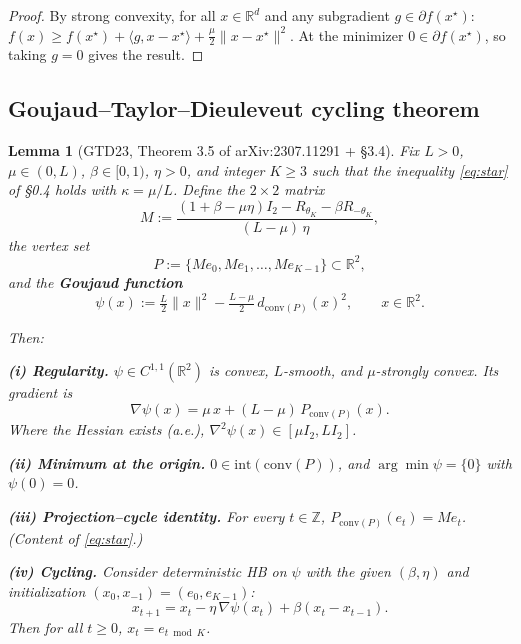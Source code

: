 \documentclass[11pt,a4paper]{article}
\theoremstyle{plain}
\newtheorem{lemma}[theorem]{Lemma}
\theoremstyle{definition}
\theoremstyle{remark}
\newcommand{\R}{\mathbb{R}}
\newcommand{\conv}{\mathrm{conv}}
\begin{document}
\begin{proof}
By strong convexity, for all $x \in \R^d$ and any subgradient $g \in \partial f(x^\star)$: $f(x) \geq f(x^\star) + \langle g, x - x^\star\rangle + \tfrac{\mu}{2}\|x - x^\star\|^2$. At the minimizer $0 \in \partial f(x^\star)$, so taking $g = 0$ gives the result.
\end{proof}

\subsection{Goujaud--Taylor--Dieuleveut cycling theorem}

\begin{lemma}[GTD23, Theorem 3.5 of arXiv:2307.11291 + \S3.4]
\label{lem:1.3}
Fix $L > 0$, $\mu \in (0, L)$, $\beta \in [0, 1)$, $\eta > 0$, and integer $K \geq 3$ such that the inequality \eqref{eq:star} of \S0.4 holds with $\kappa = \mu/L$. Define the $2 \times 2$ matrix
\begin{equation}
M := \frac{(1 + \beta - \mu \eta) I_2 - R_{\theta_K} - \beta R_{-\theta_K}}{(L - \mu)\, \eta},\tag{M-def}\label{eq:M-def}
\end{equation}
the vertex set
\[
P := \{M e_0, M e_1, \ldots, M e_{K-1}\} \subset \R^2,
\]
and the \textbf{Goujaud function}
\begin{equation}
\psi(x) := \tfrac{L}{2}\|x\|^2 - \tfrac{L - \mu}{2}\, d_{\conv(P)}(x)^2,\qquad x \in \R^2.\tag{PSI}\label{eq:PSI}
\end{equation}

Then:

\textbf{(i) Regularity.} $\psi \in C^{1,1}(\R^2)$ is convex, $L$-smooth, and $\mu$-strongly convex. Its gradient is
\begin{equation}
\nabla \psi(x) = \mu\, x + (L - \mu)\, P_{\conv(P)}(x).\tag{PSI-grad}\label{eq:PSI-grad}
\end{equation}
Where the Hessian exists (a.e.), $\nabla^2 \psi(x) \in [\mu I_2, L I_2]$.

\textbf{(ii) Minimum at the origin.} $0 \in \mathrm{int}(\conv(P))$, and $\arg\min \psi = \{0\}$ with $\psi(0) = 0$.

\textbf{(iii) Projection--cycle identity.} For every $t \in \mathbb{Z}$, $P_{\conv(P)}(e_t) = M e_t$. (Content of \eqref{eq:star}.)

\textbf{(iv) Cycling.} Consider deterministic HB on $\psi$ with the given $(\beta, \eta)$ and initialization $(x_0, x_{-1}) = (e_0, e_{K-1})$:
\[
x_{t+1} = x_t - \eta\, \nabla \psi(x_t) + \beta (x_t - x_{t-1}).
\]
Then for all $t \geq 0$, $x_t = e_{t \bmod K}$.
\end{lemma}
\end{document}
